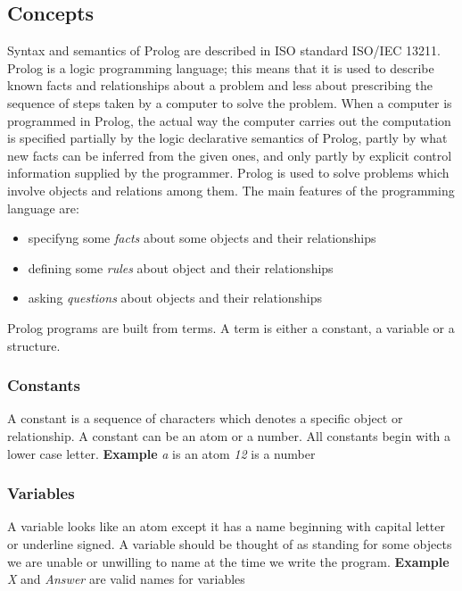 \subsection{Concepts}\label{subsec:concepts}
Syntax and semantics of Prolog are described in ISO standard ISO/IEC 13211. Prolog is a logic programming language; 
this means that it is used to describe known facts and relationships about a problem and less about prescribing
the sequence of steps taken by a computer to solve the problem.
When a computer is programmed in Prolog, the actual way the computer carries out the computation is specified
partially by the logic declarative semantics of Prolog, partly by what new facts can be inferred from the given ones,
and only partly by explicit control information supplied by the programmer.
\newline\newline
Prolog is used to solve problems which involve objects and relations among them.
The main features of the programming language are:
\begin{itemize}
    \item specifyng some \textit{facts} about some objects and their relationships
    \item defining some \textit{rules} about object and their relationships
    \item asking \textit{questions} about objects and their relationships
\end{itemize}

Prolog programs are built from terms. A term is either a constant, a variable or a structure.\newline
\subsubsection{Constants}\label{subsubsec:constants}
A constant is a sequence of characters which denotes a specific object or relationship. A constant can be an atom or a number.
All constants begin with a lower case letter.\newline\newline
\textbf{Example}\newline\newline
\textit{a} is an atom\newline
\textit{12} is a number

\subsubsection{Variables}\label{subsubsec:variables}
A variable looks like an atom except it has a name beginning with capital letter or underline signed.
A variable should be thought of as standing for some objects we are unable or unwilling to name at the time we write the program.\newline\newline
\textbf{Example}\newline\newline
\textit{X} and \textit{Answer} are valid names for variables


